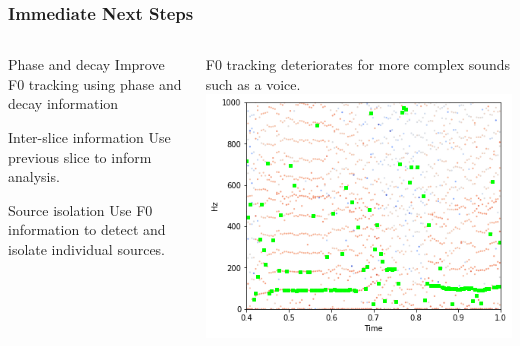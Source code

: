 \begin{frame}
\frametitle{Immediate Next Steps}
	\begin{columns}
		\begin{column}{0.5\textwidth}
			\begin{block}{Phase and decay}	
				Improve F0 tracking using phase and decay information
			\end{block}
			\begin{block}{Inter-slice information}
				Use previous slice to inform analysis. 
			\end{block}
			\begin{block}{Source isolation}
				Use F0 information to detect and isolate individual sources.
			\end{block}
		\end{column}
		\begin{column}{0.5\textwidth}
			\scriptsize{F0 tracking deteriorates for more complex sounds such as a voice.} 
			\includegraphics[width=\textwidth]{images/f0-voice.png}
		\end{column}
	\end{columns}			
\end{frame}